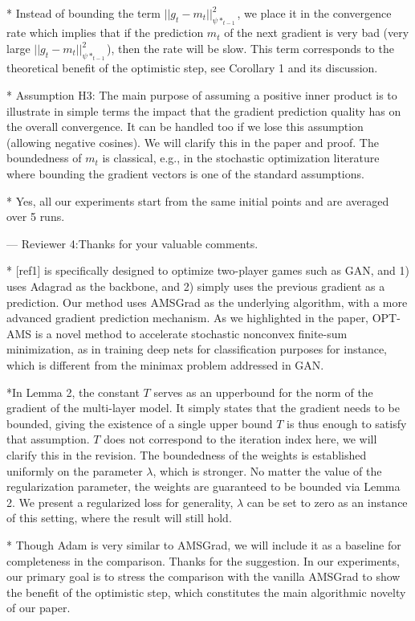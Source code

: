 \documentclass{article}
\begin{document}
* Instead of bounding the term $||g_t  - m_t ||_{\psi*_{t-1}}^2$, we place it in the convergence rate which implies that if the prediction $m_t$ of the next gradient is very bad (very large $||g_t  - m_t ||_{\psi*_{t-1}}^2$), then the rate will be slow. This term corresponds to the theoretical benefit of the optimistic step, see Corollary 1 and its discussion.

* Assumption H3: The main purpose of assuming a positive inner product is to illustrate in simple terms the impact that the gradient prediction quality has on the overall convergence. 
It can be handled too if we lose this assumption (allowing negative cosines). 
We will clarify this in the paper and proof.
The boundedness of $m_t$ is classical, e.g., in the stochastic optimization literature where bounding the gradient vectors is one of the standard assumptions.

* Yes, all our experiments start from the same initial points and are averaged over 5 runs. 


--- Reviewer 4:Thanks for your valuable comments.

* [ref1] is specifically designed to optimize two-player games such as GAN, and 1) uses Adagrad as the backbone, and 2) simply uses the previous gradient as a prediction. Our method uses AMSGrad as the underlying algorithm, with a more advanced gradient prediction mechanism. As we highlighted in the paper, OPT-AMS is a novel method to accelerate stochastic nonconvex finite-sum minimization, as in training deep nets for classification purposes for instance, which is different from the minimax problem addressed in GAN.

*In Lemma 2, the constant $T$ serves as an upperbound for the norm of the gradient of the multi-layer model. It simply states that the gradient needs to be bounded, giving the existence of a single upper bound $T$ is thus enough to satisfy that assumption. $T$ does not correspond to the iteration index here, we will clarify this in the revision.
The boundedness of the weights is established uniformly on the parameter $\lambda$, which is stronger. No matter the value of the regularization parameter, the weights are guaranteed to be bounded via Lemma 2. We present a regularized loss for generality, $\lambda$ can be set to zero as an instance of this setting, where the result will still hold.

* Though Adam is very similar to AMSGrad, we will include it as a baseline for completeness in the comparison. Thanks for the suggestion. In our experiments, our primary goal is to stress the comparison with the vanilla AMSGrad to show the benefit of the optimistic step, which constitutes the main algorithmic novelty of our paper.
\end{document}
